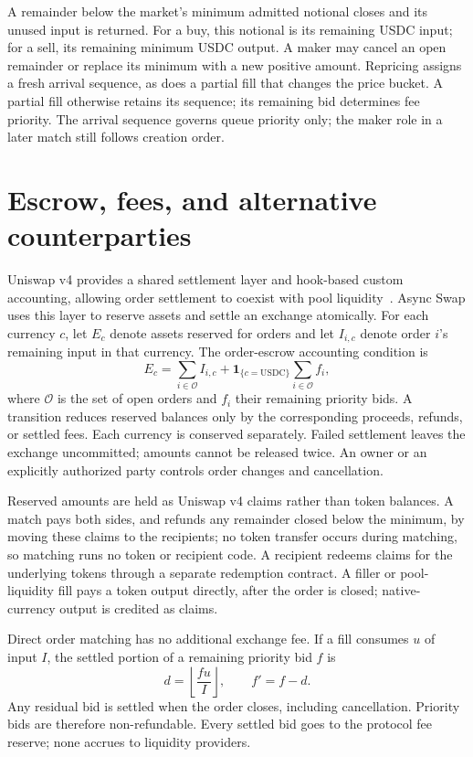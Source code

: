 \documentclass{article}
\begin{document}
A remainder below the market's minimum admitted notional closes and its unused input is
returned. For a buy, this notional is its remaining USDC input; for a sell, its remaining
minimum USDC output. A maker may cancel an open remainder or replace its minimum with a
new positive amount. Repricing assigns a fresh arrival sequence, as does a partial fill
that changes the price bucket. A partial fill otherwise retains its sequence; its remaining
bid determines fee priority. The arrival sequence governs queue priority only; the maker
role in a later match still follows creation order.

\section{Escrow, fees, and alternative counterparties}

Uniswap v4 provides a shared settlement layer and hook-based custom accounting, allowing
order settlement to coexist with pool liquidity~\cite{UniswapV4}. Async Swap uses this layer
to reserve assets and settle an exchange atomically. For each currency $c$, let $E_c$ denote
assets reserved for orders and let $I_{i,c}$ denote order $i$'s remaining input in that currency.
The order-escrow accounting condition is
\begin{equation}
 E_c=\sum_{i\in\mathcal O}I_{i,c}
       +\mathbf 1_{\{c=\mathrm{USDC}\}}\sum_{i\in\mathcal O}f_i,
 \label{eq:escrow}
\end{equation}
where $\mathcal O$ is the set of open orders and $f_i$ their remaining priority bids.
A transition reduces reserved balances only by the corresponding proceeds, refunds, or
settled fees. Each currency is conserved separately. Failed settlement leaves the exchange
uncommitted; amounts cannot be released twice. An owner or an explicitly authorized party
controls order changes and cancellation.

Reserved amounts are held as Uniswap v4 claims rather than token balances. A match pays
both sides, and refunds any remainder closed below the minimum, by moving these claims to
the recipients; no token transfer occurs during matching, so matching runs no token or
recipient code. A recipient redeems claims for the underlying tokens through a separate
redemption contract. A filler or pool-liquidity fill pays a token output directly, after
the order is closed; native-currency output is credited as claims.

Direct order matching has no additional exchange fee. If a fill consumes $u$ of input $I$,
the settled portion of a remaining priority bid $f$ is
\begin{equation}
 d=\left\lfloor\frac{fu}{I}\right\rfloor,\qquad f'=f-d.
\end{equation}
Any residual bid is settled when the order closes, including cancellation. Priority bids
are therefore non-refundable. Every settled bid goes to the protocol fee reserve; none
accrues to liquidity providers.
\end{document}
